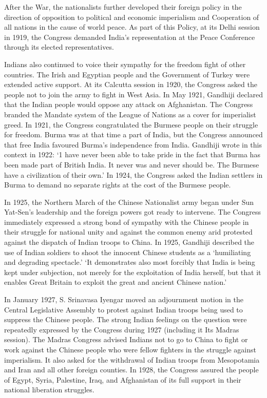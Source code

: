 \begin{multicols}{2}
After the War, the nationalists further developed their foreign policy in the direction of opposition to political and economic imperialism and Cooperation of all nations in the cause of world peace. As part of this Policy, at its Delhi session in 1919, the Congress demanded India's representation at the Peace Conference through its elected representatives. 

Indians also continued to voice their sympathy for the freedom fight of other countries. The Irish and Egyptian people and the Government of Turkey were extended active support. At its Calcutta session in 1920, the Congress asked the people not to join the army to fight in West Asia. In May 1921, Gandhiji declared that the Indian people would oppose any attack on Afghanistan. The Congress branded the Mandate system of the League of Nations as a cover for imperialist greed. In 1921, the Congress congratulated the Burmese people on their struggle for freedom. Burma was at that time a part of India, but the Congress announced that free India favoured Burma's independence from India. Gandhiji wrote in this context in 1922: `1 have never been able to take pride in the fact that Burma has been made part of British India. It never was and never should be. The Burmese have a civilization of their own.' In 1924, the Congress asked the Indian settlers in Burma to demand no separate rights at the cost of the Burmese people. 

In 1925, the Northern March of the Chinese Nationalist army began under Sun Yat-Sen's leadership and the foreign powers got ready to intervene. The Congress immediately expressed a strong bond of sympathy with the Chinese people in their struggle for national unity and against the common enemy arid protested against the dispatch of Indian troops to China. In 1925, Gandhiji described the use of Indian soldiers to shoot the innocent Chinese students as a `humiliating and degrading spectacle.' `It demonstrates also most forcibly that India is being kept under subjection, not merely for the exploitation of India herself, but that it enables Great Britain to exploit the great and ancient Chinese nation.' 

In January 1927, S. Srinavasa Iyengar moved an adjournment motion in the Central Legislative Assembly to protest against Indian troops being used to suppress the Chinese people. The strong Indian feelings on the question were repeatedly expressed by the Congress during 1927 (including it Its Madras session). The Madras Congress advised Indians not to go to China to fight or work against the Chinese people who were fellow fighters in the struggle against imperialism. It also asked for the withdrawal of Indian troops from Mesopotamia and Iran and all other foreign counties. In 1928, the Congress assured the people of Egypt, Syria, Palestine, Iraq, and Afghanistan of its full support in their national liberation struggles. 


\end{multicols}
